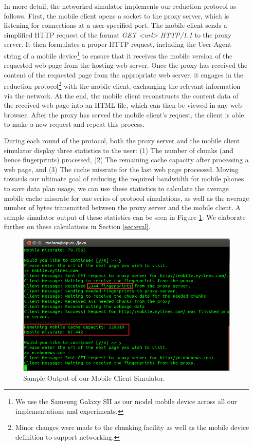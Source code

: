 In more detail, the networked simulator implements our reduction protocol as follows. First, the mobile client opens a socket to the proxy server, which is listening for connections at a user-specified port. The mobile client sends a simplified HTTP request of the format \emph{GET <url> HTTP/1.1} to the proxy server. It then formulates a proper HTTP request, including the User-Agent string of a mobile device\footnote{We use the Samsung Galaxy SII as our model mobile device across all our implementations and experiments.} to ensure that it receives the mobile version of the requested web page from the hosting web server. Once the proxy has received the content of the requested page from the appropriate web server, it engages in the reduction protocol\footnote{Minor changes were made to the chunking facility as well as the mobile device definition to support networking.} with the mobile client, exchanging the relevant information via the network. At the end, the mobile client reconstructs the content data of the received web page into an HTML file, which can then be viewed in any web browser. After the proxy has served the mobile client's request, the client is able to make a new request and repeat this process.

During each round of the protocol, both the proxy server and the mobile client simulator display three statistics to the user: (1) The number of chunks (and hence fingerprints) processed, (2) The remaining cache capacity after processing a web page, and (3) The cache missrate for the last web page processed. Moving towards our ultimate goal of reducing the required bandwidth for mobile phones to save data plan usage, we can use these statistics to calculate the average mobile cache missrate for one series of protocol simulations, as well as the average number of bytes transmitted between the proxy server and the mobile client. A sample simulator output of these statistics can be seen in Figure \ref{fig:mobsim_output}. We elaborate further on these calculations in Section \ref{sec:eval}.

\begin{figure}[h] 
\centering \includegraphics[scale=0.40]{images/mobilesim_output.png}
\caption{Sample Output of our Mobile Client Simulator.}
\label{fig:mobsim_output}
\end{figure}

